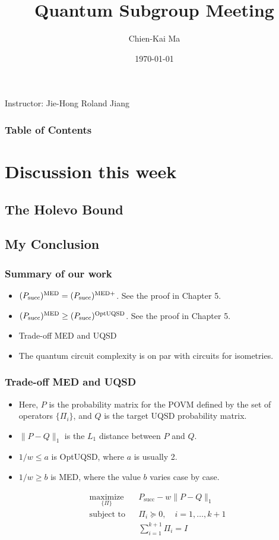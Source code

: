 \documentclass{beamer}
\title{Quantum Subgroup Meeting}
\subtitle{}
\author{Chien-Kai Ma}
\institute{NTU GIEE}
\date{\today}
\newcommand{\psucc}{P_{\textnormal{succ}}}
\newcommand{\supmed}{^{\textnormal{MED}}}
\newcommand{\supmedplus}{^{\textnormal{MED+}}}
\newcommand{\supuqsd}{^{\textnormal{OptUQSD}}}
\begin{document}
\begin{frame}
    \titlepage
    \centering
    \small{Instructor: Jie-Hong Roland Jiang}
\end{frame}

\begin{frame}
    \frametitle{Table of Contents}
    \tableofcontents
\end{frame}


\section{Discussion this week}
\subsection{The Holevo Bound}



\subsection{My Conclusion}

\begin{frame}
    \frametitle{Summary of our work}
    \begin{itemize}
        \item $(\psucc)\supmed = (\psucc)\supmedplus$.
              See the proof in Chapter 5.
        \item $(\psucc)\supmed \geq (\psucc)\supuqsd$.
              See the proof in Chapter 5.
        \item Trade-off MED and UQSD
        \item The quantum circuit complexity is on par with circuits for isometries.
    \end{itemize}

\end{frame}



\begin{frame}
    \frametitle{Trade-off MED and UQSD}
    \begin{itemize}
        \item Here, $P$ is the probability matrix for the POVM defined by the set of
              operators $\{\Pi_i\}$, and $Q$ is the target UQSD probability matrix.
        \item $\|P-Q\|_{1}$ is the $L_{1}$ distance between $P$ and $Q$.
        \item $1/w \leq a$ is OptUQSD, where $a$ is usually 2.
        \item $1/w \geq b$ is MED, where the value $b$ varies case by case.
    \end{itemize}
    \begin{align}
        \label{eq:roland_obj}
         & \underset{\{\Pi\}}{\text{maximize}} &  & P_{\text{succ}} - w \|P-Q\|_{1}             \\
         & \text{subject to}                   &  & \Pi_{i} \succeq 0, \quad i = 1, \ldots, k+1 \\
         &                                     &  & \sum_{i=1}^{k+1} \Pi_i = I
    \end{align}
\end{frame}
\end{document}
